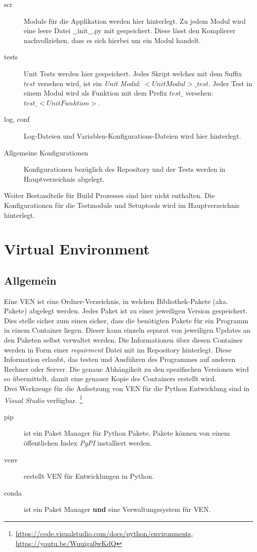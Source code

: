 \begin{description}
	\item[scr] Module für die Applikation werden hier hinterlegt. Zu jedem Modul wird eine leere Datei $\_\_$init$\_\_$.py mit gespeichert. Diese lässt den Komplierer nachvollziehen, dass es sich hierbei um ein Modul handelt.	
	\item[tests] Unit Tests werden hier gespeichert. Jedes Skript welches mit dem Suffix $test$ versehen wird, ist ein \textit{Unit Modul}: $<Unit Modul>\_test$. Jeder Test in einem Modul wird als Funktion mit dem Prefix $test\_$ versehen: $test\_<Unit Funktion>$.
	\item[log, conf] Log-Dateien und Variablen-Konfigurations-Dateien wird hier hinterlegt.
	\item[Allgemeine Konfigurationen] Konfigurationen bezüglich des Repository und der Tests werden in Hauptverzeichnis abgelegt.
\end{description}
Weiter Bestandteile für Build Prozesses sind hier nicht enthalten. Die Konfigurationen für die Testmodule und Setuptools wird im Hauptverzeichnis hinterlegt.

\section{Virtual Environment}
\subsection{Allgemein}
Eine \gls{VEN} ist eine Ordner-Verzeichnis, in welchen Bibliothek-Pakete (aka. Pakete) abgelegt werden. Jedes Paket ist zu einer jeweiligen Version gespeichert. Dies stelle sicher zum einen sicher, dass die benötigten Pakete für ein Programm in einem Container liegen. Dieser kann einzeln separat von jeweiligen Updates an den Paketen selbst verwaltet werden. Die Informationen über diesen Container werden in Form einer \textit{requirment} Datei mit im Repository hinterlegt. Diese Information erlaubt, das testen und Ausführen des Programmes auf anderen Rechner oder Server. Die genaue Abhängikeit zu den spezifischen Versionen wird so übermittelt, damit eine genauer Kopie des Containers erstellt wird.\\

Drei Werkzeuge für die Aufsetzung von \gls{VEN} für die Python Entwicklung sind in \textit{Visual Studio} verfügbar. \footnote{
	\href{Quelle}{https://code.visualstudio.com/docs/python/environments},
	\href{Conda VE in VStudio}{https://youtu.be/Wuuiga0wKdQ}
}
\begin{description}
	\item[pip] ist ein Paket Manager für Python Pakete. Pakete können von einem öffentlichen Index \textit{PyPI} installiert werden.
	\item[venv] erstellt \gls{VEN} für Entwicklungen in Python.
	\item[conda] ist ein Paket Manager \textbf{und} eine Verwaltungssystem für \gls{VEN}. 
\end{description}

